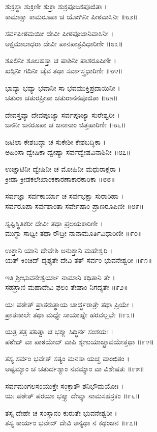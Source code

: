 ಶುಕ್ರಸ್ಥಾ ಶುಕ್ರಿಣೀ ಶುಕ್ರಾ ಶುಕ್ರಪೂಜಕಪೂಜಿತಾ ।\\
ಕಾಮಾಕ್ಷಾ ಕಾಮರೂಪಾ ಚ ಯೋಗಿನೀ ಪೀಠವಾಸಿನೀ ॥೮೨॥

ಸರ್ವಪೀಠಮಯೀ ದೇವೀ ಪೀಠಪೂಜಾನಿವಾಸಿನೀ ।\\
ಅಕ್ಷಮಾಲಾಧರಾ ದೇವೀ ಪಾನಪಾತ್ರವಿಧಾರಿಣೀ ॥೮೩॥

ಶೂಲಿನೀ ಶೂಲಹಸ್ತಾ ಚ ಪಾಶಿನೀ ಪಾಶರೂಪಿಣೀ ।\\
ಖಡ್ಗಿನೀ ಗದಿನೀ ಚೈವ ತಥಾ ಸರ್ವಾಸ್ತ್ರಧಾರಿಣೀ ॥೮೪॥

ಭಾವ್ಯಾ ಭವ್ಯಾ ಭವಾನೀ ಸಾ ಭವಮುಕ್ತಿಪ್ರದಾಯಿನೀ ।\\
ಚತುರಾ ಚತುರಪ್ರೀತಾ ಚತುರಾನನಪೂಜಿತಾ ॥೮೫॥

ದೇವಸ್ತವ್ಯಾ ದೇವಪೂಜ್ಯಾ ಸರ್ವಪೂಜ್ಯಾ ಸುರೇಶ್ವರೀ ।\\
ಜನನೀ ಜನರೂಪಾ ಚ ಜನಾನಾಂ ಚಿತ್ತಹಾರಿಣೀ ॥೮೬॥

ಜಟಿಲಾ ಕೇಶಬದ್ಧಾ ಚ ಸುಕೇಶೀ ಕೇಶಬದ್ಧಿಕಾ ।\\
ಅಹಿಂಸಾ ದ್ವೇಷಿಕಾ ದ್ವೇಷ್ಯಾ ಸರ್ವದ್ವೇಷವಿನಾಶಿನೀ ॥೮೭॥

ಉಚ್ಚಾಟಿನೀ ದ್ವೇಷಿನೀ ಚ ಮೋಹಿನೀ ಮಧುರಾಕ್ಷರಾ ।\\
ಕ್ರೀಡಾ ಕ್ರೀಡಕಲೇಖಾಂಕಕಾರಣಾಕಾರಕಾರಿಕಾ ॥೮೮॥

ಸರ್ವಜ್ಞಾ ಸರ್ವಕಾರ್ಯಾ ಚ ಸರ್ವಭಕ್ಷಾ ಸುರಾರಿಹಾ ।\\
ಸರ್ವರೂಪಾ ಸರ್ವಶಾಂತಾ ಸರ್ವೇಷಾಂ ಪ್ರಾಣರೂಪಿಣೀ ॥೮೯॥

ಸೃಷ್ಟಿಸ್ಥಿತಿಕರೀ ದೇವೀ ತಥಾ ಪ್ರಲಯಕಾರಿಣೀ ।\\
ಮುಗ್ಧಾ ಸಾಧ್ವೀ ತಥಾ ರೌದ್ರೀ ನಾನಾಮೂರ್ತಿವಿಧಾರಿಣೀ ॥೯೦॥

ಉಕ್ತಾನಿ ಯಾನಿ ದೇವೇಶಿ ಅನುಕ್ತಾನಿ ಮಹೇಶ್ವರಿ ।\\
ಯತ್ ಕಿಂಚಿದ್ ದೃಶ್ಯತೇ ದೇವಿ ತತ್ ಸರ್ವಂ ಭುವನೇಶ್ವರೀ ॥೯೧॥

ಇತಿ ಶ್ರೀಭುವನೇಶ್ವರ್ಯಾ ನಾಮಾನಿ ಕಥಿತಾನಿ ತೇ ।\\
ಸಹಸ್ರಾಣಿ ಮಹಾದೇವಿ ಫಲಂ ತೇಷಾಂ ನಿಗದ್ಯತೇ ॥೯೨॥

ಯಃ ಪಠೇತ್ ಪ್ರಾತರುತ್ಥಾಯ ಚಾರ್ದ್ಧರಾತ್ರೇ ತಥಾ ಪ್ರಿಯೇ ।\\
ಪ್ರಾತಃಕಾಲೇ ತಥಾ ಮಧ್ಯೇ ಸಾಯಾಹ್ನೇ ಹರವಲ್ಲಭೇ ॥೯೩॥

ಯತ್ರ ತತ್ರ ಪಠಿತ್ವಾ ಚ ಭಕ್ತ್ಯಾ ಸಿದ್ಧಿರ್ನ ಸಂಶಯಃ ।\\
ಪಠೇದ್ ವಾ ಪಾಠಯೇದ್ ವಾಪಿ ಶೃಣುಯಾಚ್ಛ್ರಾವಯೇತ್ತಥಾ ॥೯೪॥

ತಸ್ಯ ಸರ್ವಂ ಭವೇತ್ ಸತ್ಯಂ ಮನಸಾ ಯಚ್ಚ ವಾಂಛಿತಂ ।\\
ಅಷ್ಟಮ್ಯಾಂ ಚ ಚತುರ್ದಶ್ಯಾಂ ನವಮ್ಯಾಂ ವಾ ವಿಶೇಷತಃ ॥೯೫॥

ಸರ್ವಮಂಗಲಸಂಯುಕ್ತೇ ಸಂಕ್ರಾತೌ ಶನಿಭೌಮಯೋಃ ।\\
ಯಃ ಪಠೇತ್ ಪರಯಾ ಭಕ್ತ್ಯಾ ದೇವ್ಯಾ ನಾಮಸಹಸ್ರಕಂ ॥೯೬॥

ತಸ್ಯ ದೇಹೇ ಚ ಸಂಸ್ಥಾನಂ ಕುರುತೇ ಭುವನೇಶ್ವರೀ ।\\
ತಸ್ಯ ಕಾರ್ಯಂ ಭವೇದ್ ದೇವಿ ಅನ್ಯಥಾ ನ ಕಥಂಚನ ॥೯೭॥

